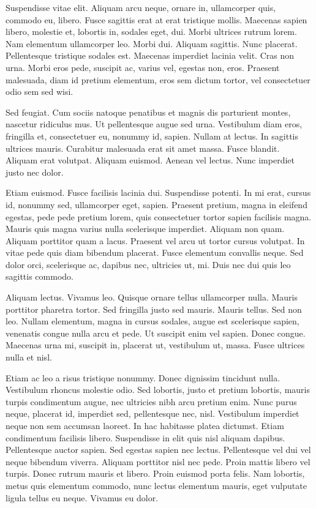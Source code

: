 \documentclass{article}
\begin{document}
Suspendisse vitae elit. Aliquam arcu neque, ornare in, ullamcorper quis,
commodo eu, libero. Fusce sagittis erat at erat tristique mollis. Maecenas
sapien libero, molestie et, lobortis in, sodales eget, dui. Morbi ultrices
rutrum lorem. Nam elementum ullamcorper leo. Morbi dui. Aliquam sagittis. Nunc
placerat. Pellentesque tristique sodales est. Maecenas imperdiet lacinia velit.
Cras non urna. Morbi eros pede, suscipit ac, varius vel, egestas non, eros.
Praesent malesuada, diam id pretium elementum, eros sem dictum tortor, vel
consectetuer odio sem sed wisi.

Sed feugiat. Cum sociis natoque penatibus et magnis dis parturient montes,
nascetur ridiculus mus. Ut pellentesque augue sed urna. Vestibulum diam eros,
fringilla et, consectetuer eu, nonummy id, sapien. Nullam at lectus. In
sagittis ultrices mauris. Curabitur malesuada erat sit amet massa. Fusce
blandit. Aliquam erat volutpat. Aliquam euismod. Aenean vel lectus. Nunc
imperdiet justo nec dolor.

Etiam euismod. Fusce facilisis lacinia dui. Suspendisse potenti. In mi erat,
cursus id, nonummy sed, ullamcorper eget, sapien. Praesent pretium, magna in
eleifend egestas, pede pede pretium lorem, quis consectetuer tortor sapien
facilisis magna. Mauris quis magna varius nulla scelerisque imperdiet. Aliquam
non quam. Aliquam porttitor quam a lacus. Praesent vel arcu ut tortor cursus
volutpat. In vitae pede quis diam bibendum placerat. Fusce elementum convallis
neque. Sed dolor orci, scelerisque ac, dapibus nec, ultricies ut, mi. Duis nec
dui quis leo sagittis commodo.

Aliquam lectus. Vivamus leo. Quisque ornare tellus ullamcorper nulla. Mauris
porttitor pharetra tortor. Sed fringilla justo sed mauris. Mauris tellus. Sed
non leo. Nullam elementum, magna in cursus sodales, augue est scelerisque
sapien, venenatis congue nulla arcu et pede. Ut suscipit enim vel sapien. Donec
congue. Maecenas urna mi, suscipit in, placerat ut, vestibulum ut, massa. Fusce
ultrices nulla et nisl.

Etiam ac leo a risus tristique nonummy. Donec dignissim tincidunt nulla.
Vestibulum rhoncus molestie odio. Sed lobortis, justo et pretium lobortis,
mauris turpis condimentum augue, nec ultricies nibh arcu pretium enim. Nunc
purus neque, placerat id, imperdiet sed, pellentesque nec, nisl. Vestibulum
imperdiet neque non sem accumsan laoreet. In hac habitasse platea dictumst.
Etiam condimentum facilisis libero. Suspendisse in elit quis nisl aliquam
dapibus. Pellentesque auctor sapien. Sed egestas sapien nec lectus.
Pellentesque vel dui vel neque bibendum viverra. Aliquam porttitor nisl nec
pede. Proin mattis libero vel turpis. Donec rutrum mauris et libero. Proin
euismod porta felis. Nam lobortis, metus quis elementum commodo, nunc lectus
elementum mauris, eget vulputate ligula tellus eu neque. Vivamus eu dolor.
\end{document}
